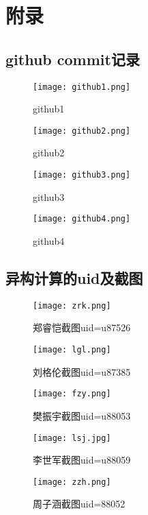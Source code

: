 \appendix
\chapter*{附录}
\section*{github commit记录}
\begin{figure}[htbp]
    \centering
    \texttt{[image: github1.png]}
    \caption{github1}\label{fig:github1}
    \vspace{\baselineskip}
    \end{figure}
    \begin{figure}[htbp]
        \centering
        \texttt{[image: github2.png]}
        \caption{github2}\label{fig:github2}
        \vspace{\baselineskip}
        \end{figure} 
        \begin{figure}[htbp]
            \centering
            \texttt{[image: github3.png]}
            \caption{github3}\label{fig:github3}
            \vspace{\baselineskip}
            \end{figure}
            \begin{figure}[htbp]
                \centering
                \texttt{[image: github4.png]}
                \caption{github4}\label{fig:github4}
                \vspace{\baselineskip}
                \end{figure}
    \clearpage
\section*{异构计算的uid及截图}

\begin{figure}[htbp]
\centering
\texttt{[image: zrk.png]}
\caption{郑睿恺截图uid=u87526}\label{fig:zrk}
\vspace{\baselineskip}
\end{figure}
\begin{figure}[h]
\centering
\texttt{[image: lgl.png]}
\caption{刘格伦截图uid=u87385}\label{fig:lgl}
\vspace{\baselineskip}
\end{figure}
\begin{figure}[h]
\centering
\texttt{[image: fzy.png]}
\caption{樊振宇截图uid=u88053}\label{fig:fzy}
\vspace{\baselineskip}
\end{figure}    
\begin{figure}[h]
\centering
\texttt{[image: lsj.jpg]}
\caption{李世军截图uid=u88059}\label{fig:lsj}
\vspace{\baselineskip}
\end{figure}
\begin{figure}[h]
\centering
\texttt{[image: zzh.png]}
\caption{周子涵截图uid=88052}\label{fig:zzh}
\vspace{\baselineskip}
\end{figure}
\clearpage
